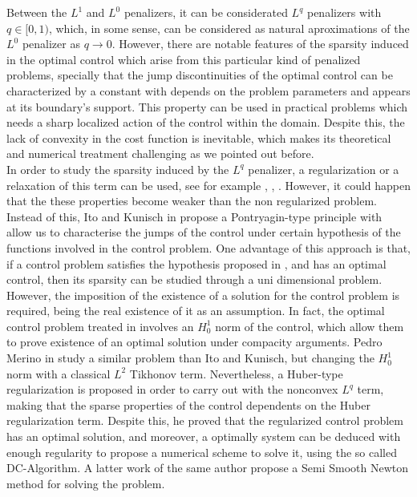 Between the $L^1$ and $L^0$ penalizers, it can be considerated $L^q$ penalizers with $q\in [0,1)$, which, in some sense, can be considered as natural aproximations of the $L^0$ penalizer \cite{merino2019} as $q\to 0$. However, there are notable features of the sparsity induced in the optimal control which arise from this particular kind of penalized problems, specially that the jump discontinuities of the optimal control can be characterized by a constant with depends on the problem parameters and appears at its boundary's support. This property can be used in practical problems which needs a sharp localized action of the control within the domain. Despite this, the lack of convexity in the cost function is inevitable, which makes  its theoretical and numerical treatment challenging as we pointed out before.\\

In order to study the sparsity induced by the $L^q$ penalizer, a regularization or a relaxation of this term can be used, see for example \cite{ekeland}, \cite{shane}, \cite{warga}. However, it could happen that the these properties become weaker than the non regularized problem. Instead of this, Ito and Kunisch in \cite{ito-kunisch2014} propose a Pontryagin-type principle with allow us to characterise the jumps of the control under certain hypothesis of the functions involved in the control problem. One advantage of this approach is that, if a control problem satisfies the hypothesis proposed in \cite{ito-kunisch2014}, and has an optimal control, then its sparsity can be studied through a uni dimensional problem. However, the imposition of the existence of a solution for the control problem is required, being the real existence of it as an assumption. In fact, the optimal control problem treated in \cite{ito-kunisch2014} involves an $H_{0}^{1}$ norm of the control, which allow them to prove existence of an optimal solution under compacity arguments. Pedro Merino in \cite{merino2019} study a similar problem than Ito and Kunisch, but changing the $H_0^1$ norm with a classical $L^2$ Tikhonov term. Nevertheless, a Huber-type regularization is proposed in order to carry out with the nonconvex $L^q$ term, making that the sparse properties of the control dependents on the Huber regularization term. Despite this, he proved that the regularized control problem has an optimal solution, and moreover, a optimally system can be deduced with enough regularity to propose a numerical scheme to solve it, using the so called DC-Algorithm. A latter work of the same author propose a Semi Smooth Newton method for solving the problem.\\

